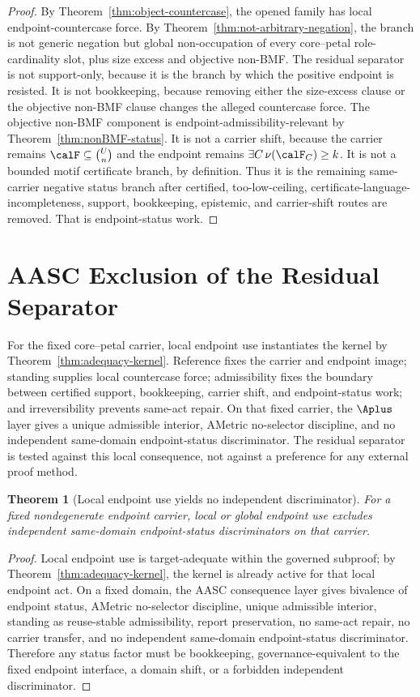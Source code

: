 \documentclass[11pt]{article}
\newtheorem{theorem}{Theorem}[section]
\begin{document}
\begin{proof}
By Theorem~\ref{thm:object-countercase}, the opened family has local endpoint-countercase force.  By Theorem~\ref{thm:not-arbitrary-negation}, the branch is not generic negation but global non-occupation of every core--petal role-cardinality slot, plus size excess and objective non-BMF.  The residual separator is not support-only, because it is the branch by which the positive endpoint is resisted.  It is not bookkeeping, because removing either the size-excess clause or the objective non-BMF clause changes the alleged countercase force.  The objective non-BMF component is endpoint-admissibility-relevant by Theorem~\ref{thm:nonBMF-status}.  It is not a carrier shift, because the carrier remains \(\calF\subseteq\binom{U}{n}\) and the endpoint remains \(\exists C\,\nu(\calF_C)\ge k\).  It is not a bounded motif certificate branch, by definition.  Thus it is the remaining same-carrier negative status branch after certified, too-low-ceiling, certificate-language-incompleteness, support, bookkeeping, epistemic, and carrier-shift routes are removed.  That is endpoint-status work.
\end{proof}

\section{AASC Exclusion of the Residual Separator}

For the fixed core--petal carrier, local endpoint use instantiates the kernel by Theorem~\ref{thm:adequacy-kernel}.  Reference fixes the carrier and endpoint image; standing supplies local countercase force; admissibility fixes the boundary between certified support, bookkeeping, carrier shift, and endpoint-status work; and irreversibility prevents same-act repair.  On that fixed carrier, the \(\Aplus\) layer gives a unique admissible interior, AMetric no-selector discipline, and no independent same-domain endpoint-status discriminator.  The residual separator is tested against this local consequence, not against a preference for any external proof method.

\begin{theorem}[Local endpoint use yields no independent discriminator]\label{thm:no-ind-disc}
For a fixed nondegenerate endpoint carrier, local or global endpoint use excludes independent same-domain endpoint-status discriminators on that carrier.
\end{theorem}

\begin{proof}
Local endpoint use is target-adequate within the governed subproof; by Theorem~\ref{thm:adequacy-kernel}, the kernel is already active for that local endpoint act.  On a fixed domain, the AASC consequence layer gives bivalence of endpoint status, AMetric no-selector discipline, unique admissible interior, standing as reuse-stable admissibility, report preservation, no same-act repair, no carrier transfer, and no independent same-domain endpoint-status discriminator.  Therefore any status factor must be bookkeeping, governance-equivalent to the fixed endpoint interface, a domain shift, or a forbidden independent discriminator.
\end{proof}
\end{document}
